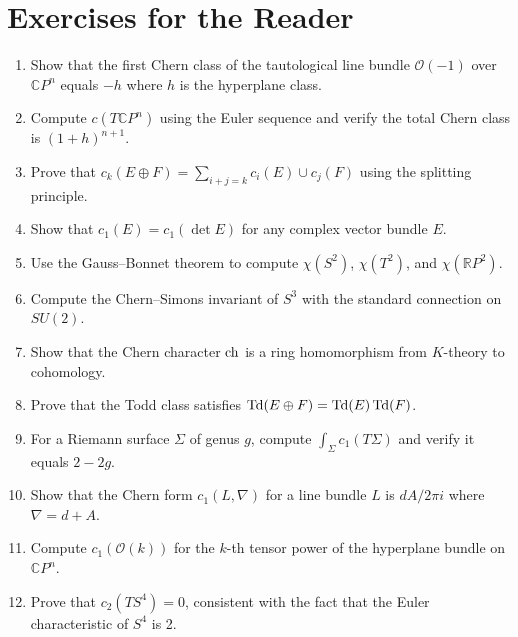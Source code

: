 \section*{Exercises for the Reader}
\begin{enumerate}
    \item [I] Show that the first Chern class of the tautological line bundle $\mathcal{O}(-1)$ over $\mathbb{C}P^n$ equals $-h$ where $h$ is the hyperplane class.
    \item [I] Compute $c(T\mathbb{C}P^n)$ using the Euler sequence and verify the total Chern class is $(1 + h)^{n+1}$.
    \item [I] Prove that $c_k(E \oplus F) = \sum_{i+j=k} c_i(E) \cup c_j(F)$ using the splitting principle.
    \item [B] Show that $c_1(E) = c_1(\det E)$ for any complex vector bundle $E$.
    \item [B] Use the Gauss--Bonnet theorem to compute $\chi(S^2)$, $\chi(T^2)$, and $\chi(\mathbb{R}P^2)$.
    \item [A] Compute the Chern--Simons invariant of $S^3$ with the standard connection on $SU(2)$.
    \item [A] Show that the Chern character $\operatorname{ch}$ is a ring homomorphism from $K$-theory to cohomology.
    \item [I] Prove that the Todd class satisfies $\operatorname{Td}(E \oplus F) = \operatorname{Td}(E) \operatorname{Td}(F)$.
    \item [B] For a Riemann surface $\Sigma$ of genus $g$, compute $\int_\Sigma c_1(T\Sigma)$ and verify it equals $2-2g$.
    \item [I] Show that the Chern form $c_1(L, \nabla)$ for a line bundle $L$ is $dA/2\pi i$ where $\nabla = d + A$.
    \item [B] Compute $c_1(\mathcal{O}(k))$ for the $k$-th tensor power of the hyperplane bundle on $\mathbb{C}P^n$.
    \item [B] Prove that $c_2(TS^4) = 0$, consistent with the fact that the Euler characteristic of $S^4$ is 2.
\end{enumerate}

